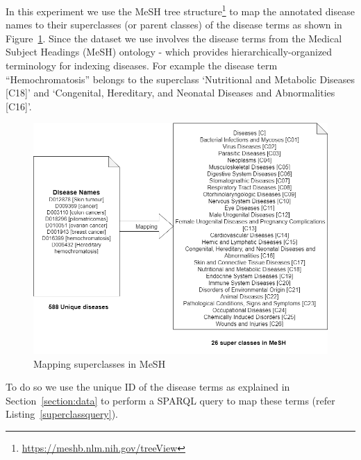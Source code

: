 In this experiment we use the MeSH tree structure\footnote{\url{https://meshb.nlm.nih.gov/treeView}} to map the annotated disease names to their superclasses (or parent classes) of the disease terms as shown in Figure~\ref{fig:meshsuperclass}. 
Since the dataset we use involves the disease terms from the Medical Subject Headings (MeSH) ontology - which provides hierarchically-organized terminology for indexing diseases. For example the disease term ``Hemochromatosis'' belongs to the superclass `Nutritional and Metabolic Diseases [C18]' and `Congenital, Hereditary, and Neonatal Diseases and Abnormalities [C16]'. 
\begin{figure}[!htb]
    \centering
    \includegraphics[scale=0.4]{Figures/NN_prediction.png}
    \caption{Mapping superclasses in MeSH}
    \label{fig:meshsuperclass}
\end{figure}
To do so we use the unique ID of the disease terms as explained in Section~\ref{section:data} to perform a SPARQL query to map these terms (refer Listing~\ref{superclassquery}). 

